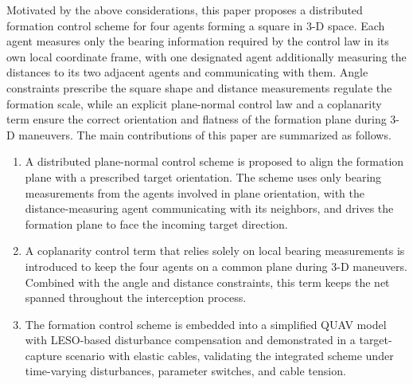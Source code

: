 \documentclass[letterpaper,journal]{IEEEtran}
\theoremstyle{plain}
\theoremstyle{definition}
\theoremstyle{remark}
\begin{document}
Motivated by the above considerations, this paper proposes a distributed formation control scheme for four agents forming a square in 3-D space. Each agent measures only the bearing information required by the control law in its own local coordinate frame, with one designated agent additionally measuring the distances to its two adjacent agents and communicating with them. Angle constraints prescribe the square shape and distance measurements regulate the formation scale, while an explicit plane-normal control law and a coplanarity term ensure the correct orientation and flatness of the formation plane during 3-D maneuvers. The main contributions of this paper are summarized as follows.
\begin{enumerate}[leftmargin=*,nosep]
\item A distributed plane-normal control scheme is proposed to align the formation plane with a prescribed target orientation. The scheme uses only bearing measurements from the agents involved in plane orientation, with the distance-measuring agent communicating with its neighbors, and drives the formation plane to face the incoming target direction.
\item A coplanarity control term that relies solely on local bearing measurements is introduced to keep the four agents on a common plane during 3-D maneuvers. Combined with the angle and distance constraints, this term keeps the net spanned throughout the interception process.
\item The formation control scheme is embedded into a simplified QUAV model with LESO-based disturbance compensation and demonstrated in a target-capture scenario with elastic cables, validating the integrated scheme under time-varying disturbances, parameter switches, and cable tension.
\end{enumerate}


\end{document}
